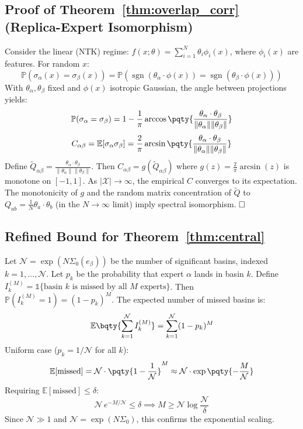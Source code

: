 \documentclass[12pt,a4paper]{article}
\newcommand{\E}{\mathbb{E}}
\newcommand{\Pbb}{\mathbb{P}}
\newcommand{\sgn}{\operatorname{sgn}}
\begin{document}
\subsection{Proof of Theorem~\ref{thm:overlap_corr} (Replica-Expert Isomorphism)}
Consider the linear (NTK) regime: \(f(x; \theta) = \sum_{i=1}^{N} \theta_i \phi_i(x)\), where \(\phi_i(x)\) are features. For random \(x\):
\begin{equation}
\Pbb(\sigma_\alpha(x) = \sigma_\beta(x)) = \Pbb(\sgn(\theta_\alpha \cdot \phi(x)) = \sgn(\theta_\beta \cdot \phi(x)))
\end{equation}
With \(\theta_\alpha, \theta_\beta\) fixed and \(\phi(x)\) isotropic Gaussian, the angle between projections yields:
\begin{equation}
\Pbb(\sigma_\alpha = \sigma_\beta) = 1 - \frac{1}{\pi} \arccos\pqty{\frac{\theta_\alpha \cdot \theta_\beta}{\|\theta_\alpha\| \|\theta_\beta\|}}
\end{equation}
\begin{equation}
C_{\alpha\beta} = \E[\sigma_\alpha \sigma_\beta] = \frac{2}{\pi} \arcsin\pqty{\frac{\theta_\alpha \cdot \theta_\beta}{\|\theta_\alpha\| \|\theta_\beta\|}}
\end{equation}
Define \(\tilde{Q}_{\alpha\beta} = \frac{\theta_\alpha \cdot \theta_\beta}{\|\theta_\alpha\| \|\theta_\beta\|}\). Then \(C_{\alpha\beta} = g(\tilde{Q}_{\alpha\beta})\) where \(g(z) = \frac{2}{\pi}\arcsin(z)\) is monotone on \([-1,1]\). As \(|\mathcal{X}| \to \infty\), the empirical \(C\) converges to its expectation. The monotonicity of \(g\) and the random matrix concentration of \(\tilde{Q}\) to \(Q_{ab} = \frac{1}{N}\theta_a \cdot \theta_b\) (in the \(N \to \infty\) limit) imply spectral isomorphism. \(\hfill \square\)

\subsection{Refined Bound for Theorem~\ref{thm:central}}
Let \(\mathcal{N} = \exp(N \Sigma_0(e_\beta))\) be the number of significant basins, indexed \(k = 1, \ldots, \mathcal{N}\). Let \(p_k\) be the probability that expert \(\alpha\) lands in basin \(k\). Define \(I_k^{(M)} = \mathbb{1}\{\text{basin } k \text{ is missed by all } M \text{ experts}\}\). Then \(\Pbb(I_k^{(M)} = 1) = (1 - p_k)^M\). The expected number of missed basins is:
\begin{equation}
\E\bqty{\sum_{k=1}^{\mathcal{N}} I_k^{(M)}} = \sum_{k=1}^{\mathcal{N}} (1 - p_k)^M
\end{equation}
Uniform case (\(p_k = 1/\mathcal{N}\) for all \(k\)):
\begin{equation}
\E[\text{missed}] = \mathcal{N} \cdot \pqty{1 - \frac{1}{\mathcal{N}}}^M \approx \mathcal{N} \cdot \exp\pqty{-\frac{M}{\mathcal{N}}}
\end{equation}
Requiring \(\E[\text{missed}] \leq \delta\):
\begin{equation}
\mathcal{N} \, e^{-M / \mathcal{N}} \leq \delta \implies M \geq \mathcal{N} \log \frac{\mathcal{N}}{\delta}
\end{equation}
Since \(\mathcal{N} \gg 1\) and \(\mathcal{N} = \exp(N \Sigma_0)\), this confirms the exponential scaling.
\end{document}
